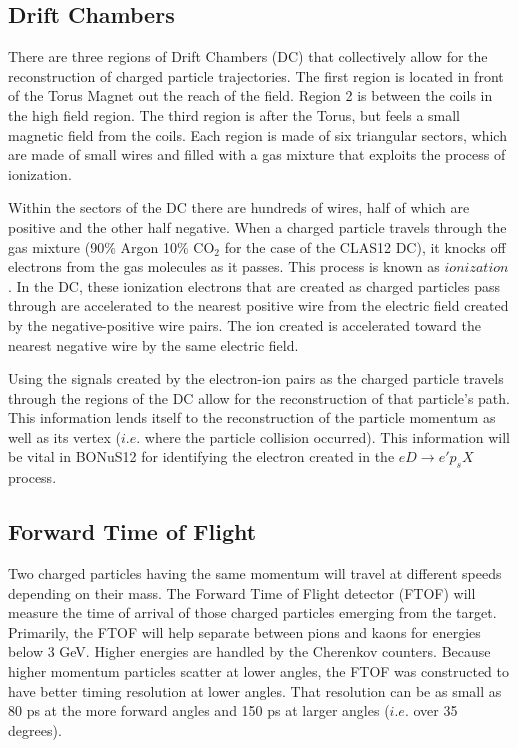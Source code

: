 \subsection{Drift Chambers}
There are three regions of Drift Chambers (DC) that collectively allow for the reconstruction of charged particle trajectories. The first region is located in front of the Torus Magnet out the reach of the field. Region 2 is between the coils in the high field region. The third region is after the Torus, but feels a small magnetic field from the coils. Each region is made of six triangular sectors, which are made of small wires and filled with a gas mixture that exploits the process of ionization.

Within the sectors of the DC there are hundreds of wires, half of which are positive and the other half negative. When a charged particle travels through the gas mixture (90$\%$ Argon 10$\%$ CO$_2$ for the case of the CLAS12 DC), it knocks off electrons from the gas molecules as it passes. This process is known as $ionization$. In the DC, these ionization electrons that are created as charged particles pass through are accelerated to the nearest positive wire from the electric field created by the negative-positive wire pairs. The ion created is accelerated toward the nearest negative wire by the same electric field.

Using the signals created by the electron-ion pairs as the charged particle travels through the regions of the DC allow for the reconstruction of that particle's path. This information lends itself to the reconstruction of the particle momentum as well as its vertex ($i.e.$ where the particle collision occurred). This information will be vital in BONuS12 for identifying the electron created in the $eD \rightarrow e'p_sX$ process.

\subsection{Forward Time of Flight}
Two charged particles having the same momentum will travel at different speeds depending on their mass. The Forward Time of Flight detector (FTOF) will measure the time of arrival of those charged particles emerging from the target. Primarily, the FTOF will help separate between pions and kaons for energies below 3 GeV. Higher energies are handled by the Cherenkov counters. Because higher momentum particles scatter at lower angles, the FTOF was constructed to have better timing resolution at lower angles. That resolution can be as small as 80 ps at the more forward angles and 150 ps at larger angles ($i.e.$ over 35 degrees).


